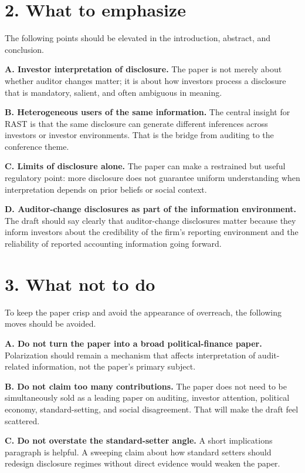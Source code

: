 \documentclass[11pt]{article}
\begin{document}
\section*{2. What to emphasize}

The following points should be elevated in the introduction, abstract, and conclusion.

\textbf{A. Investor interpretation of disclosure.} The paper is not merely about whether auditor changes matter; it is about how investors process a disclosure that is mandatory, salient, and often ambiguous in meaning.

\textbf{B. Heterogeneous users of the same information.} The central insight for RAST is that the same disclosure can generate different inferences across investors or investor environments. That is the bridge from auditing to the conference theme.

\textbf{C. Limits of disclosure alone.} The paper can make a restrained but useful regulatory point: more disclosure does not guarantee uniform understanding when interpretation depends on prior beliefs or social context.

\textbf{D. Auditor-change disclosures as part of the information environment.} The draft should say clearly that auditor-change disclosures matter because they inform investors about the credibility of the firm’s reporting environment and the reliability of reported accounting information going forward.

\section*{3. What not to do}

To keep the paper crisp and avoid the appearance of overreach, the following moves should be avoided.

\textbf{A. Do not turn the paper into a broad political-finance paper.} Polarization should remain a mechanism that affects interpretation of audit-related information, not the paper’s primary subject.

\textbf{B. Do not claim too many contributions.} The paper does not need to be simultaneously sold as a leading paper on auditing, investor attention, political economy, standard-setting, and social disagreement. That will make the draft feel scattered.

\textbf{C. Do not overstate the standard-setter angle.} A short implications paragraph is helpful. A sweeping claim about how standard setters should redesign disclosure regimes without direct evidence would weaken the paper.
\end{document}
